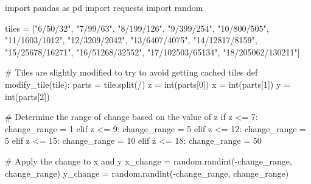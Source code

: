 \documentclass[
  oneside,
  open=any]{scrbook}
\newenvironment{Shaded}{\begin{snugshade}}{\end{snugshade}}
\newcommand{\BuiltInTok}[1]{\textcolor[rgb]{0.00,0.23,0.31}{#1}}
\newcommand{\CommentTok}[1]{\textcolor[rgb]{0.37,0.37,0.37}{#1}}
\newcommand{\ControlFlowTok}[1]{\textcolor[rgb]{0.00,0.23,0.31}{#1}}
\newcommand{\DecValTok}[1]{\textcolor[rgb]{0.68,0.00,0.00}{#1}}
\newcommand{\ImportTok}[1]{\textcolor[rgb]{0.00,0.46,0.62}{#1}}
\newcommand{\KeywordTok}[1]{\textcolor[rgb]{0.00,0.23,0.31}{#1}}
\newcommand{\NormalTok}[1]{\textcolor[rgb]{0.00,0.23,0.31}{#1}}
\newcommand{\OperatorTok}[1]{\textcolor[rgb]{0.37,0.37,0.37}{#1}}
\newcommand{\StringTok}[1]{\textcolor[rgb]{0.13,0.47,0.30}{#1}}
\begin{document}
\begin{Shaded}
\begin{Highlighting}[]
\ImportTok{import}\NormalTok{ pandas }\ImportTok{as}\NormalTok{ pd}
\ImportTok{import}\NormalTok{ requests}
\ImportTok{import}\NormalTok{ random}

\NormalTok{tiles }\OperatorTok{=}\NormalTok{ [}\StringTok{"6/50/32"}\NormalTok{, }\StringTok{"7/99/63"}\NormalTok{, }\StringTok{"8/199/126"}\NormalTok{, }\StringTok{"9/399/254"}\NormalTok{, }\StringTok{"10/800/505"}\NormalTok{, }\StringTok{"11/1603/1012"}\NormalTok{,  }\StringTok{"12/3209/2042"}\NormalTok{, }
\StringTok{"13/6407/4075"}\NormalTok{, }\StringTok{"14/12817/8159"}\NormalTok{, }\StringTok{"15/25678/16271"}\NormalTok{, }\StringTok{"16/51268/32552"}\NormalTok{, }
\StringTok{"17/102503/65134"}\NormalTok{, }\StringTok{"18/205062/130211"}\NormalTok{]}

\CommentTok{\# Tiles are slightly modified to try to avoid getting cached tiles}
\KeywordTok{def}\NormalTok{ modify\_tile(tile):}
\NormalTok{    parts }\OperatorTok{=}\NormalTok{ tile.split(}\StringTok{\textquotesingle{}/\textquotesingle{}}\NormalTok{)}
\NormalTok{    z }\OperatorTok{=} \BuiltInTok{int}\NormalTok{(parts[}\DecValTok{0}\NormalTok{])}
\NormalTok{    x }\OperatorTok{=} \BuiltInTok{int}\NormalTok{(parts[}\DecValTok{1}\NormalTok{])}
\NormalTok{    y }\OperatorTok{=} \BuiltInTok{int}\NormalTok{(parts[}\DecValTok{2}\NormalTok{])}

    \CommentTok{\# Determine the range of change based on the value of z}
    \ControlFlowTok{if}\NormalTok{ z }\OperatorTok{\textless{}=} \DecValTok{7}\NormalTok{:}
\NormalTok{        change\_range }\OperatorTok{=} \DecValTok{1}
    \ControlFlowTok{elif}\NormalTok{ z }\OperatorTok{\textless{}=} \DecValTok{9}\NormalTok{:}
\NormalTok{        change\_range }\OperatorTok{=} \DecValTok{5}
    \ControlFlowTok{elif}\NormalTok{ z }\OperatorTok{\textless{}=} \DecValTok{12}\NormalTok{:}
\NormalTok{        change\_range }\OperatorTok{=} \DecValTok{5}
    \ControlFlowTok{elif}\NormalTok{ z }\OperatorTok{\textless{}=} \DecValTok{15}\NormalTok{:}
\NormalTok{        change\_range }\OperatorTok{=} \DecValTok{10}
    \ControlFlowTok{elif}\NormalTok{ z }\OperatorTok{\textless{}=} \DecValTok{18}\NormalTok{:}
\NormalTok{        change\_range }\OperatorTok{=} \DecValTok{50}

    \CommentTok{\# Apply the change to x and y}
\NormalTok{    x\_change }\OperatorTok{=}\NormalTok{ random.randint(}\OperatorTok{{-}}\NormalTok{change\_range, change\_range)}
\NormalTok{    y\_change }\OperatorTok{=}\NormalTok{ random.randint(}\OperatorTok{{-}}\NormalTok{change\_range, change\_range)}


\end{Highlighting}
\end{Shaded}
\end{document}
